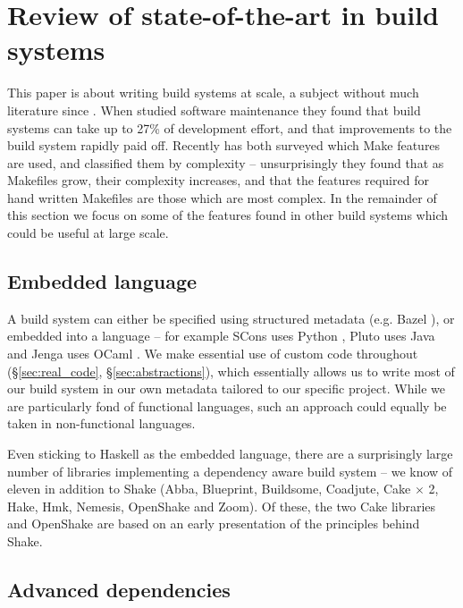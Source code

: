 \section{Review of state-of-the-art in build systems\label{section-review}}

This paper is about writing build systems at scale, a subject without much literature since \citet{miller:recursive_make}. When \citet{mcintosh:build_maintenance_effort} studied software maintenance they found that build systems can take up to 27\% of development effort, and that improvements to the build system rapidly paid off. Recently \citet{martin:make_it_simple, martin:maintenance_complexity_makefiles} has both surveyed which Make features are used, and classified them by complexity -- unsurprisingly they found that as Makefiles grow, their complexity increases, and that the features required for hand written Makefiles are those which are most complex. In the remainder of this section we focus on some of the features found in other build systems which could be useful at large scale.

\subsection{Embedded language}

A build system can either be specified using structured metadata (e.g. Bazel \cite{bazel}), or embedded into a language -- for example SCons uses Python \cite{scons}, Pluto uses Java \cite{pluto} and Jenga uses OCaml \cite{jenga}. We make essential use of custom code throughout (\S\ref{sec:real_code}, \S\ref{sec:abstractions}), which essentially allows us to write most of our build system in our own metadata tailored to our specific project. While we are particularly fond of functional languages, such an approach could equally be taken in non-functional languages.

Even sticking to Haskell as the embedded language, there are a surprisingly large number of libraries implementing a dependency aware build system -- we know of eleven in addition to Shake (Abba, Blueprint, Buildsome, Coadjute, Cake $\times$ 2, Hake, Hmk, Nemesis, OpenShake and Zoom). Of these, the two Cake libraries and OpenShake are based on an early presentation of the principles behind Shake.

\subsection{Advanced dependencies}

